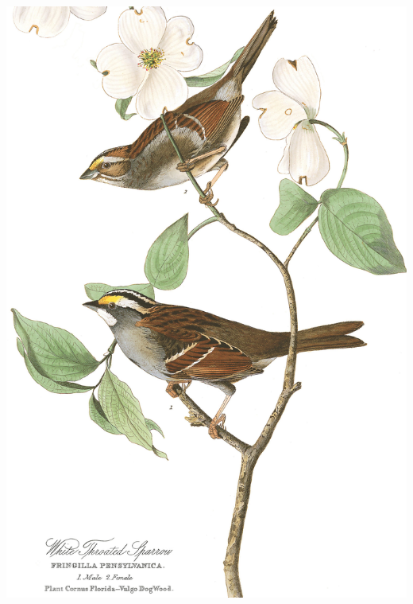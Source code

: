 {{\begin{marginfigure}
\begin{center}   %
  \includegraphics[width = \textwidth]{illustration_images/alleles_genotypes/White_throated_sparrow/white_throated_sparrow.jpg}
\end{center}
\caption{White-throated sparrows ({\it Zonotrichia albicollis}) with a
  white morph (bottom, male) and tan morph (top, female). The
  difference between the morphs wasn't fully appreciated until the 1960's \citep{lowther1961polymorphism}, previously birders  %
thought the tan morphs were just young or females individuals (so
Audubon's male and female labels may well by wrong). There are also a number of behavioural differences, with
both sexes of the white-striped morph invest more in territorial
defense and the tan-striped morphs more parental care.
  {\newline \noindent  \tiny{ From John James Audubon's Birds of
      America (1827). Image  
    from \href{https://www.audubon.org/birds-of-america/white-throated-sparrow}{Audubon.org},
    public domain.}}}\label{White_throated_sparrows}  
\end{marginfigure}

}}
